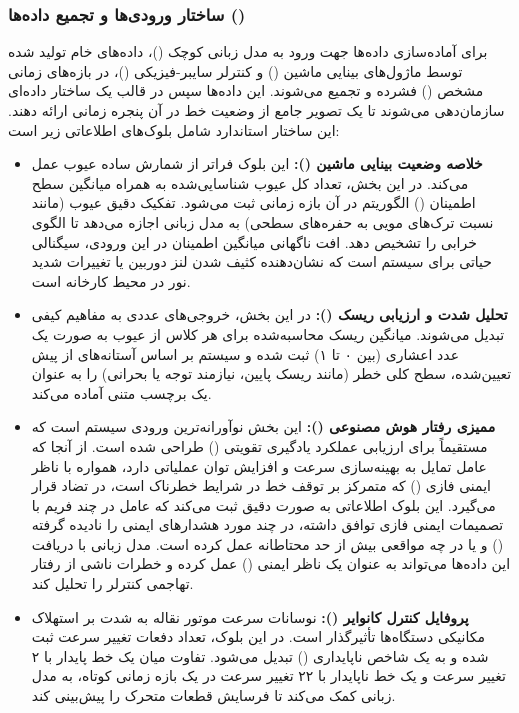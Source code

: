 \documentclass[a4paper, 10pt, twocolumn]{article}
\begin{document}
	\subsubsection{ساختار ورودی‌ها و تجمیع داده‌ها ()}
	برای آماده‌سازی داده‌ها جهت ورود به مدل زبانی کوچک ()، داده‌های خام تولید شده توسط ماژول‌های بینایی ماشین () و کنترلر سایبر-فیزیکی ()، در بازه‌های زمانی مشخص () فشرده و تجمیع می‌شوند. این داده‌ها سپس در قالب یک ساختار داده‌ای  سازمان‌دهی می‌شوند تا یک تصویر جامع از وضعیت خط در آن پنجره زمانی ارائه دهند. این ساختار استاندارد شامل بلوک‌های اطلاعاتی زیر است:
	
	\begin{itemize}
		\item \textbf{خلاصه وضعیت بینایی ماشین ():} این بلوک فراتر از شمارش ساده عیوب عمل می‌کند. در این بخش، تعداد کل عیوب شناسایی‌شده به همراه میانگین سطح اطمینان () الگوریتم  در آن بازه زمانی ثبت می‌شود. تفکیک دقیق عیوب (مانند نسبت ترک‌های مویی به حفره‌های سطحی) به مدل زبانی اجازه می‌دهد تا الگوی خرابی را تشخیص دهد. افت ناگهانی میانگین اطمینان در این ورودی، سیگنالی حیاتی برای سیستم است که نشان‌دهنده کثیف شدن لنز دوربین یا تغییرات شدید نور در محیط کارخانه است.
		
		\item \textbf{تحلیل شدت و ارزیابی ریسک ():} در این بخش، خروجی‌های عددی به مفاهیم کیفی تبدیل می‌شوند. میانگین ریسک محاسبه‌شده برای هر کلاس از عیوب به صورت یک عدد اعشاری (بین ۰ تا ۱) ثبت شده و سیستم بر اساس آستانه‌های از پیش تعیین‌شده، سطح کلی خطر (مانند ریسک پایین، نیازمند توجه یا بحرانی) را به عنوان یک برچسب متنی آماده می‌کند.
		
		\item \textbf{ممیزی رفتار هوش مصنوعی ():} این بخش نوآورانه‌ترین ورودی سیستم است که مستقیماً برای ارزیابی عملکرد یادگیری تقویتی () طراحی شده است. از آنجا که عامل  تمایل به بهینه‌سازی سرعت و افزایش توان عملیاتی دارد، همواره با ناظر ایمنی فازی () که متمرکز بر توقف خط در شرایط خطرناک است، در تضاد قرار می‌گیرد. این بلوک اطلاعاتی به صورت دقیق ثبت می‌کند که عامل  در چند فریم با تصمیمات ایمنی فازی توافق داشته، در چند مورد هشدارهای ایمنی را نادیده گرفته () و یا در چه مواقعی بیش از حد محتاطانه عمل کرده است. مدل زبانی با دریافت این داده‌ها می‌تواند به عنوان یک ناظر ایمنی () عمل کرده و خطرات ناشی از رفتار تهاجمی کنترلر را تحلیل کند.
		
		\item \textbf{پروفایل کنترل کانوایر ():} نوسانات سرعت موتور نقاله به شدت بر استهلاک مکانیکی دستگاه‌ها تأثیرگذار است. در این بلوک، تعداد دفعات تغییر سرعت ثبت شده و به یک شاخص ناپایداری () تبدیل می‌شود. تفاوت میان یک خط پایدار با ۲ تغییر سرعت و یک خط ناپایدار با ۲۲ تغییر سرعت در یک بازه زمانی کوتاه، به مدل زبانی کمک می‌کند تا فرسایش قطعات متحرک را پیش‌بینی کند.
	\end{itemize}
	
\end{document}
